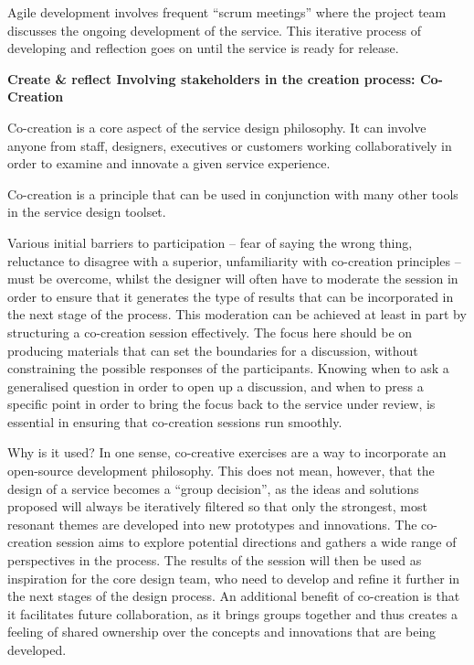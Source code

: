 Agile development involves frequent “scrum meetings” where the project team discusses the ongoing development of the service. This iterative process of developing and reflection goes on until the service is ready for release.

\textbf{Create \& reflect Involving stakeholders in the creation process: Co-Creation}

Co-creation is a core aspect of the service design philosophy. It can involve anyone from staff, designers, executives or customers working collaboratively in order to examine and innovate a given service experience.

Co-creation is a principle that can be used in conjunction with many other tools in the service design toolset.

Various initial barriers to participation – fear of saying the wrong thing, reluctance to disagree with a superior, unfamiliarity with co-creation principles – must be overcome, whilst the designer will often have to moderate the session in order to ensure that it generates the type of results that can be incorporated in the next stage of the process.
This moderation can be achieved at least in part by structuring a co-creation session effectively. The focus here should be on producing materials that can set the boundaries for a discussion, without constraining the possible responses of the participants. Knowing when to ask a generalised question in order to open up a discussion, and when to press a specific point in order to bring the focus back to the service under review, is essential in ensuring that co-creation sessions run smoothly.

Why is it used?
In one sense, co-creative exercises are a way to incorporate an open-source development philosophy. This does not mean, however, that the design of a service becomes a “group decision”, as the ideas and solutions proposed will always be iteratively filtered so that only the strongest, most resonant themes are developed into new prototypes and innovations. The co-creation session aims to explore potential directions and gathers a wide range of perspectives in the process. The results of the session will then be used as inspiration for the core design team, who need to develop and refine it further in the next stages of the design process. An additional benefit of co-creation is that it facilitates future collaboration, as it brings groups together and thus creates a feeling of shared ownership over the concepts and innovations that are being developed.

